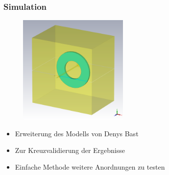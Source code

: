 \documentclass[accentcolor=tud9b, colorbacktitle, inverttitle]{tudbeamer}
\begin{document}
\begin{frame}\frametitle{Simulation}
\vspace{-1em}
\begin{multicols}{2}
\begin{figure}[h]
	\centering
	\includegraphics[width=0.48\textwidth]{BoxRK}
\end{figure}
\vfill\null
\columnbreak
\begin{itemize}
	\item Erweiterung des Modells von Denys Bast
	\item Zur Kreuzvalidierung der Ergebnisse
	\item Einfache Methode weitere Anordnungen zu testen
\end{itemize}
\end{multicols}
\end{frame}
\end{document}
